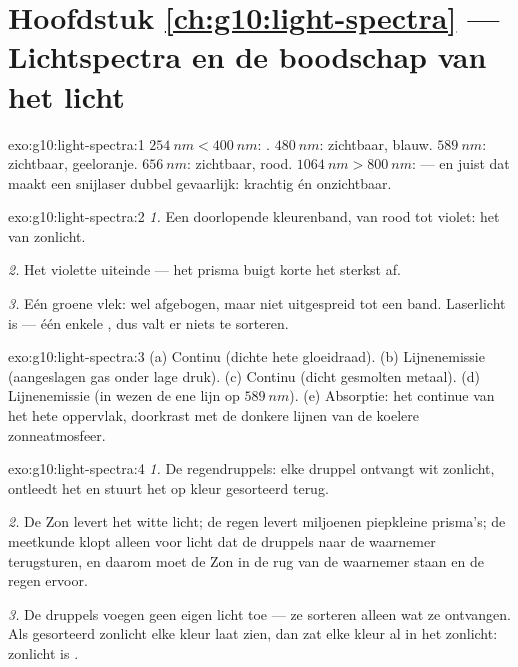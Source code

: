 \section*{Hoofdstuk \ref{ch:g10:light-spectra} --- Lichtspectra en de boodschap van het licht}

\begin{solution}{exo:g10:light-spectra:1}
$\qty{254}{nm} < \qty{400}{nm}$: . $\qty{480}{nm}$:
zichtbaar, blauw. $\qty{589}{nm}$: zichtbaar, geeloranje.
$\qty{656}{nm}$: zichtbaar, rood. $\qty{1064}{nm} > \qty{800}{nm}$:
 --- en juist dat maakt een snijlaser dubbel gevaarlijk:
krachtig én onzichtbaar.
\end{solution}

\begin{solution}{exo:g10:light-spectra:2}
\emph{1.} Een doorlopende kleurenband, van rood tot violet: het 
van zonlicht.

\emph{2.} Het violette uiteinde --- het prisma buigt korte 
het sterkst af.

\emph{3.} Eén groene vlek: wel afgebogen, maar niet uitgespreid tot een
band. Laserlicht is  --- één enkele , dus valt
er niets te sorteren.
\end{solution}

\begin{solution}{exo:g10:light-spectra:3}
(a) Continu (dichte hete gloeidraad). (b) Lijnenemissie (aangeslagen gas
onder lage druk). (c) Continu (dicht gesmolten metaal). (d)
Lijnenemissie (in wezen de ene lijn op $\qty{589}{nm}$). (e) Absorptie:
het continue  van het hete oppervlak, doorkrast met de donkere
lijnen van de koelere zonneatmosfeer.
\end{solution}

\begin{solution}{exo:g10:light-spectra:4}
\emph{1.} De regendruppels: elke druppel ontvangt wit zonlicht, ontleedt
het en stuurt het op kleur gesorteerd terug.

\emph{2.} De Zon levert het witte licht; de regen levert miljoenen
piepkleine prisma's; de meetkunde klopt alleen voor licht dat de
druppels naar de waarnemer terugsturen, en daarom moet de Zon in de rug
van de waarnemer staan en de regen ervoor.

\emph{3.} De druppels voegen geen eigen licht toe --- ze sorteren alleen
wat ze ontvangen. Als gesorteerd zonlicht elke kleur laat zien, dan zat
elke kleur al in het zonlicht: zonlicht is .
\end{solution}


